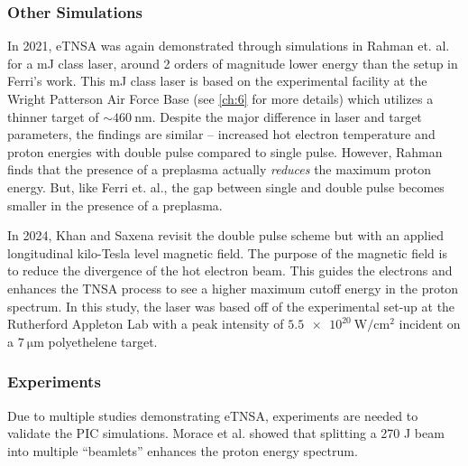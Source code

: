 \subsubsection{Other Simulations}
In 2021, eTNSA was again demonstrated through simulations in Rahman et. al.\cite{Rahman_2021_PoP} for a mJ class laser, around 2 orders of magnitude lower energy than the setup in Ferri's work. This mJ class laser is based on the experimental facility at the Wright Patterson Air Force Base (see \cref{ch:6} for more details) which utilizes a thinner target of $\sim \SI{460}{\nano \meter}$. Despite the major difference in laser and target parameters, the findings are similar -- increased hot electron temperature and proton energies with double pulse compared to single pulse. However, Rahman finds that the presence of a preplasma actually \emph{reduces} the maximum proton energy. But, like Ferri et. al., the gap between single and double pulse becomes smaller in the presence of a preplasma.

In 2024, Khan and Saxena\cite{Khan_2024_NJoP} revisit the double pulse scheme but with an applied longitudinal kilo-Tesla level magnetic field. The purpose of the magnetic field is to reduce the divergence of the hot electron beam. This guides the electrons and enhances the TNSA process to see a higher maximum cutoff energy in the proton spectrum\cite{Arefiev_2016_NJoP}. In this study, the laser was based off of the experimental set-up at the Rutherford Appleton Lab with a peak intensity of $\SI{5.5e20}{\watt \per \centi \meter \squared}$ incident on a $\SI{7}{\micro \meter}$ polyethelene target. 


\subsubsection{Experiments}

Due to multiple studies demonstrating eTNSA\cite{Ferri_2019_Nat_Comm,Rahman_2021_PoP,Khan_2024_NJoP}, experiments are needed to validate the PIC simulations. Morace et al.\cite{Morace_2019_Nat_Comm} showed that splitting a 270 J beam into multiple ``beamlets'' enhances the proton energy spectrum.


